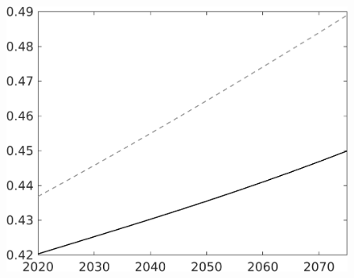 \documentclass[12pt]{article}
\begin{document}
\begin{figure}[h!!]
\begin{minipage}[]{0.32\textwidth}
\end{minipage}	
\begin{minipage}[]{0.32\textwidth}
\includegraphics[width=1\textwidth]{../../codding_model/own_basedOnFried/optimalPol_010922_revision/figures/all_13Sept22/LevTaufNoTauf_TaulCalib_Equlab_regime0_EY_spillover0_nsk0_xgr1_knspil1_sep1_LFlimit0_emsbase0_countec0_GovRev0_etaa0.79_lgd0.png}
\end{minipage}		
\end{figure}
\end{document}
